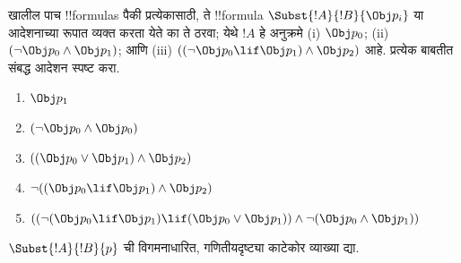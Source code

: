 \documentclass[../../../include/open-logic-section]{subfiles}
\begin{document}
\begin{prob} खालील पाच !!{formula}s पैकी प्रत्येकासाठी, ते
 !!{formula} \( \Subst{!A}{!B}{\Obj p_i} \) या आदेशनाच्या रूपात व्यक्त
 करता येते का ते ठरवा; येथे \( !A \) हे अनुक्रमे (i) \( \Obj p_0 \);
 (ii) \( ( \lnot \Obj p_0 \land \Obj p_1) \); आणि (iii)
 \( ( ( \lnot \Obj p_0 \lif \Obj p_1 ) \land \Obj p_2 ) \) आहे.
 प्रत्येक बाबतीत संबद्ध आदेशन स्पष्ट करा.
  \begin{enumerate}
    \item \( \Obj p_1 \) 
    \item \( ( \lnot \Obj p_0 \land \Obj p_0 ) \)
    \item \( ( ( \Obj p_0 \lor \Obj p_1 ) \land \Obj p_2 )  \)
    \item \( \lnot ( ( \Obj p_0 \lif \Obj p_1 ) \land \Obj p_2 ) \)
    \item \( (( \lnot ( \Obj p_0 \lif \Obj p_1 ) \lif ( \Obj p_0 \lor \Obj p_1 )) \land \lnot ( \Obj p_0 \land \Obj p_1 )) \)
  \end{enumerate}
\end{prob}

\begin{prob}
$\Subst{!A}{!B}{p}$ ची विगमनाधारित, गणितीयदृष्ट्या काटेकोर व्याख्या
द्या.
\end{prob}
\end{document}
